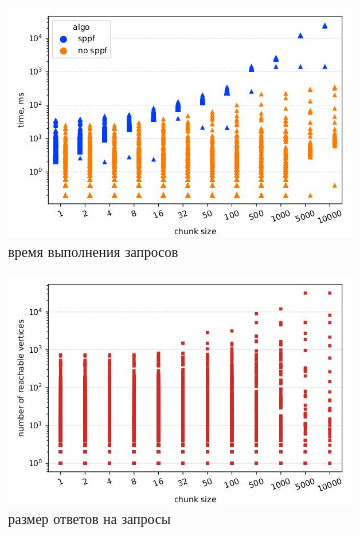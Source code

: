 \documentclass[14pt]{matmex-diploma-custom}
\theoremstyle{definition}
\begin{document}
    \begin{figure}[H]
    \begin{center}
    \begin{subfigure}[b]{0.8\textwidth}
    \centering
    \includegraphics[width=\textwidth]{pics/geospecies_sppf_bt.pdf_1.jpg} \caption{время выполнения запросов}
    \label{fig:subim3}
    \end{subfigure}%
    \end{center}
    \begin{subfigure}[b]{0.5\textwidth}
    \centering
    \includegraphics[width=\textwidth]{pics/geospecies_ans_bt.pdf_1.jpg} \caption{размер ответов на запросы}
    \label{fig:subim4} 
    \end{subfigure}
        \begin{subfigure}[b]{0.5\textwidth}
    \centering

\end{subfigure}
\end{figure}
\end{document}

